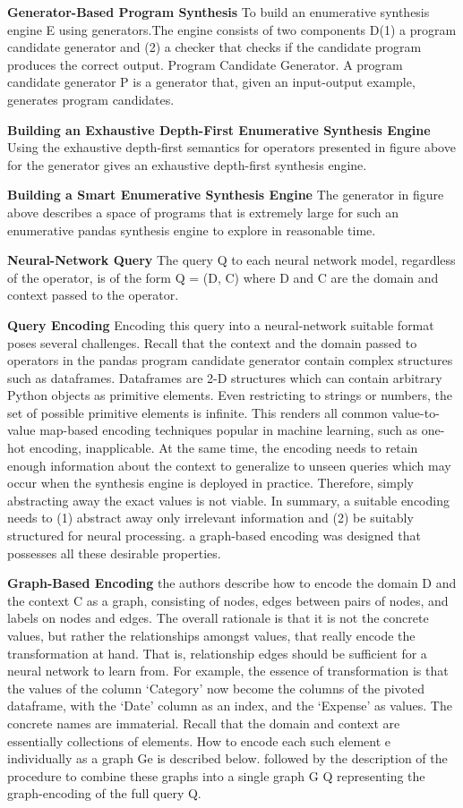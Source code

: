 \documentclass{article}
\begin{document}
\textbf{Generator-Based Program Synthesis} To build an enumerative synthesis engine E using generators.The engine consists of two components D(1) a program candidate generator and (2) a checker that checks if the candidate program produces the correct output. Program Candidate Generator. A program candidate generator P is a generator that, given an input-output example, generates program candidates.

\textbf{Building an Exhaustive Depth-First Enumerative Synthesis Engine} Using the exhaustive depth-first semantics for operators presented in figure above for the generator gives an exhaustive depth-first synthesis engine. 

\textbf{Building a Smart Enumerative Synthesis Engine} The generator in figure above describes a space of programs that is extremely large for such an enumerative pandas synthesis engine to explore in reasonable time.

\textbf{Neural-Network Query} The query Q to each neural network model, regardless of the operator, is of the form Q = (D, C) where D and C are the domain and context passed to the operator.

\textbf{Query Encoding} Encoding this query into a neural-network suitable format poses several challenges. Recall that the context and the domain passed to operators in the pandas program candidate generator contain complex structures such as dataframes. Dataframes are 2-D structures which can contain arbitrary Python objects as primitive elements. Even restricting to strings or numbers, the set of possible primitive elements is infinite. This renders all common value-to-value map-based encoding techniques popular in machine learning, such as one-hot encoding, inapplicable. At the same time, the encoding needs to retain enough information about the context to generalize to unseen queries which may occur when the synthesis engine is deployed in practice. Therefore, simply abstracting away the exact values is not viable. In summary, a suitable encoding needs to (1) abstract away only irrelevant information and (2) be suitably structured for neural processing. a graph-based encoding was designed that possesses all these desirable properties.

\textbf{Graph-Based Encoding} the authors describe how to encode the domain D and the context C as a graph, consisting of nodes, edges between pairs of nodes, and labels on nodes and edges. The overall rationale is that it is not the concrete values, but rather the relationships amongst values, that really encode the transformation at hand. That is, relationship edges should be sufficient for a neural network to learn from. For example, the essence of transformation is that the values of the column ‘Category’ now become the columns of the pivoted dataframe, with the ‘Date’ column as an index, and the ‘Expense’ as values. The concrete names are immaterial.
Recall that the domain and context are essentially collections of elements. How to encode each such element e individually as a graph Ge is described below. followed by the description of the procedure to combine these graphs into a single graph G Q representing the graph-encoding of the full query Q.
\end{document}
